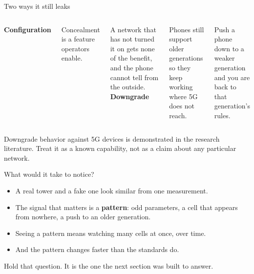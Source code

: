 \begin{frame}{Two ways it still leaks}
  \vspace{0.4em}
  \begin{columns}[T,onlytextwidth]
      \large\textbf{\textcolor{coreorange}{Configuration}}

      \vspace{0.5em}
      \small
      Concealment is a feature operators enable.

      \vspace{0.5em}
      A network that has not turned it on gets none of the benefit, and
      the phone cannot tell from the outside.
      \large\textbf{\textcolor{coreorange}{Downgrade}}

      \vspace{0.5em}
      \small
      Phones still support older generations so they keep working
      where 5G does not reach.

      \vspace{0.5em}
      Push a phone down to a weaker generation and you are back to that
      generation's rules.
  \end{columns}

  \vspace{0.8em}

  \vspace{0.3em}
  {\scriptsize\textcolor{softgray}{Downgrade behavior against 5G devices is
   demonstrated in the research literature. Treat it as a known capability,
   not as a claim about any particular network.}\par}
\end{frame}

\begin{frame}{What would it take to notice?}
  \vspace{0.4em}
  \small
  \begin{itemize}\itemsep6pt
    \item A real tower and a fake one look similar from one measurement.
    \item The signal that matters is a \textbf{pattern}: odd parameters, a
      cell that appears from nowhere, a push to an older generation.
    \item Seeing a pattern means watching many cells at once, over time.
    \item And the pattern changes faster than the standards do.
  \end{itemize}

  \vspace{0.8em}

  \vspace{0.4em}
  {\small\textcolor{softgray}{Hold that question. It is the one the next section
   was built to answer.}\par}
\end{frame}

